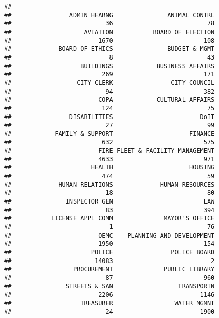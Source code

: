 \documentclass[]{book}
\newenvironment{Shaded}{\begin{snugshade}}{\end{snugshade}}
\newcommand{\KeywordTok}[1]{\textcolor[rgb]{0.13,0.29,0.53}{\textbf{#1}}}
\newcommand{\NormalTok}[1]{#1}
\newcommand{\OperatorTok}[1]{\textcolor[rgb]{0.81,0.36,0.00}{\textbf{#1}}}
\begin{document}
\begin{Shaded}
\end{Shaded}

\begin{verbatim}
## 
##                ADMIN HEARNG               ANIMAL CONTRL 
##                          36                          78 
##                    AVIATION           BOARD OF ELECTION 
##                        1670                         108 
##             BOARD OF ETHICS               BUDGET & MGMT 
##                           8                          43 
##                   BUILDINGS            BUSINESS AFFAIRS 
##                         269                         171 
##                  CITY CLERK                CITY COUNCIL 
##                          94                         382 
##                        COPA            CULTURAL AFFAIRS 
##                         124                          75 
##                DISABILITIES                        DoIT 
##                          27                          99 
##            FAMILY & SUPPORT                     FINANCE 
##                         632                         575 
##                        FIRE FLEET & FACILITY MANAGEMENT 
##                        4633                         971 
##                      HEALTH                     HOUSING 
##                         474                          59 
##             HUMAN RELATIONS             HUMAN RESOURCES 
##                          18                          80 
##               INSPECTOR GEN                         LAW 
##                          83                         394 
##           LICENSE APPL COMM              MAYOR'S OFFICE 
##                           1                          76 
##                        OEMC    PLANNING AND DEVELOPMENT 
##                        1950                         154 
##                      POLICE                POLICE BOARD 
##                       14083                           2 
##                 PROCUREMENT              PUBLIC LIBRARY 
##                          87                         960 
##               STREETS & SAN                  TRANSPORTN 
##                        2206                        1146 
##                   TREASURER                 WATER MGMNT 
##                          24                        1900
\end{verbatim}
\end{document}
